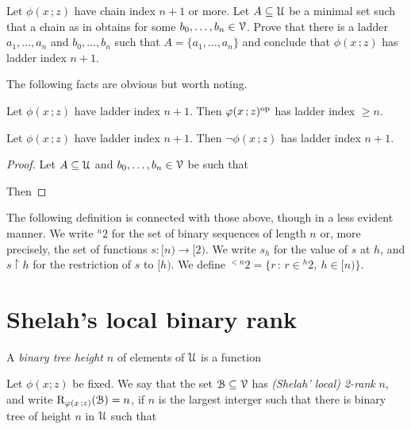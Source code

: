 \documentclass[scombinatorics.tex]{subfiles}
\begin{document}
\begin{exercise}
  Let $\phi(x\,;z)$ have chain index $n+1$ or more. 
  Let $A\subseteq\U$ be a minimal set such that a chain as in  obtains for some $b_0,\dots,b_n\in\V$.
  Prove that there is a ladder $a_1,\dots,a_n$ and $b_0,\dots,b_n$ such that $A=\{a_1,\dots,a_n\}$ and conclude that $\phi(x\,;z)$ has ladder index $n+1$.\QED
\end{exercise}

The following facts are obvious but worth noting.

\begin{fact}\label{fact_stability_dual}
  Let $\phi(x\,;z)$ have ladder index $n+1$. 
  Then $\phi(x\,;z)^{\rm op}$ has ladder index $\ge n$.\QED
\end{fact}
 
\begin{fact}\label{fact_stability_neg}
  Let $\phi(x\,;z)$ have ladder index $n+1$. 
  Then $\neg\phi(x\,;z)$ has ladder index $n+1$.\QED
\end{fact}

\begin{proof} Let $A\subseteq\U$ and $b_0,\dots,b_n\in\V$  be such that


  Then
  
\end{proof}
 
The following definition is connected with those above, though in a less evident manner.
We write ${}^n2$ for the set of binary sequences of length $n$ or, more precisely, the set of functions $s:[n)\to[2)$.
We write $s_h$ for the value of $s$ at $h$, and $s{\restriction} h$ for the restriction of $s$ to $[h)$.
We define ${}^{<n}2=\big\{r\, :\, r\in {}^h2,\ h\in[n)\big\}$.


\section{Shelah's local binary rank}

A \emph{binary tree height $n$\/} of elements of $\U$ is a function 

\nopagebreak[4]\par
{}

Let $\phi(x;z)$ be fixed. 
We say that the set $\B\subseteq\V$ has \emph{(Shelah' local) 2-rank\/} $n$, and write ${\rm R}_{\phi(x\,;z)}(\B)=n$, if $n$ is the largest interger such that there is binary tree of height $n$ in $\U$ such that 
\end{document}
